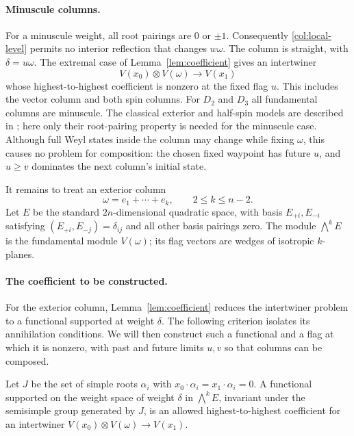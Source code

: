 \paragraph{Minuscule columns.}
For a minuscule weight, all root pairings are $0$ or $\pm1$.
Consequently \eqref{col:local-level} permits no interior reflection
that changes $w\omega$.  The column is straight, with
$\delta=u\omega$.  The extremal case of
Lemma~\ref{lem:coefficient} gives an intertwiner
\[
 V(x_0)\otimes V(\omega)\longrightarrow V(x_1)
\]
whose highest-to-highest coefficient is nonzero at the fixed flag $u$.
This includes the vector column and both spin columns.  For $D_2$
and $D_3$ all fundamental columns are minuscule.
The classical exterior and half-spin models are described in
\cite[Lectures~19--20]{FH91}; here only their root-pairing property
is needed for the minuscule case.
Although full Weyl states inside the column may change while fixing
$\omega$, this causes no problem for composition: the chosen fixed
waypoint has future $u$, and $u\ge v$ dominates the next column's
initial state.

It remains to treat an exterior column
\[
 \omega=e_1+\cdots+e_k,\qquad 2\le k\le n-2.
\]
Let $E$ be the standard $2n$-dimensional quadratic space, with basis
$E_{+i},E_{-i}$ satisfying
$(E_{+i},E_{-j})=\delta_{ij}$ and all other basis pairings zero.
The module $\bigwedge^k E$ is the fundamental module $V(\omega)$;
its flag vectors are wedges of isotropic $k$-planes.

\paragraph{The coefficient to be constructed.}
For the exterior column, Lemma~\ref{lem:coefficient} reduces the
intertwiner problem to a functional supported at weight $\delta$.
The following criterion isolates its annihilation conditions. We will
then construct such a functional and a flag at which it is nonzero,
with past and future limits $u,v$ so that columns can be composed.

\begin{lemma}\label{col:common-walls}
Let $J$ be the set of simple roots $\alpha_i$ with
$x_0\cdot\alpha_i=x_1\cdot\alpha_i=0$.
A functional supported on the weight space of weight $\delta$ in
$\bigwedge^k E$, invariant under the semisimple group generated by
$J$, is an allowed highest-to-highest coefficient for an intertwiner
$V(x_0)\otimes V(\omega)\to V(x_1)$.
\end{lemma}

